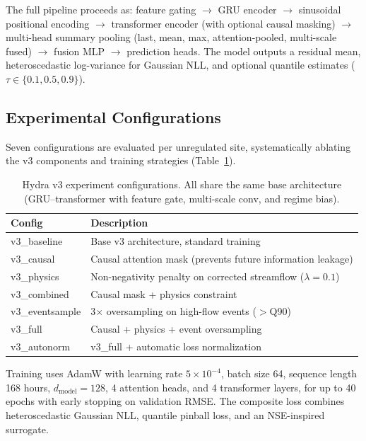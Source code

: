 \documentclass[draft]{agujournal2019}
\begin{document}
The full pipeline proceeds as: feature gating $\to$ GRU encoder $\to$ sinusoidal positional encoding $\to$ transformer encoder (with optional causal masking) $\to$ multi-head summary pooling (last, mean, max, attention-pooled, multi-scale fused) $\to$ fusion MLP $\to$ prediction heads. The model outputs a residual mean, heteroscedastic log-variance for Gaussian NLL, and optional quantile estimates ($\tau \in \{0.1, 0.5, 0.9\}$).

\subsection{Experimental Configurations}

Seven configurations are evaluated per unregulated site, systematically ablating the v3 components and training strategies (Table~\ref{tab:configs}).

\begin{table}
    \centering
    \caption{Hydra v3 experiment configurations. All share the same base architecture (GRU--transformer with feature gate, multi-scale conv, and regime bias).}
    \begin{tabular}{lp{8cm}}
        \toprule
        \textbf{Config} & \textbf{Description} \\
        \midrule
        v3\_baseline & Base v3 architecture, standard training \\
        v3\_causal & Causal attention mask (prevents future information leakage) \\
        v3\_physics & Non-negativity penalty on corrected streamflow ($\lambda = 0.1$) \\
        v3\_combined & Causal mask + physics constraint \\
        v3\_eventsample & 3$\times$ oversampling on high-flow events ($>$Q90) \\
        v3\_full & Causal + physics + event oversampling \\
        v3\_autonorm & v3\_full + automatic loss normalization \\
        \bottomrule
    \end{tabular}
    \label{tab:configs}
\end{table}

Training uses AdamW with learning rate $5 \times 10^{-4}$, batch size 64, sequence length 168 hours, $d_{\text{model}} = 128$, 4 attention heads, and 4 transformer layers, for up to 40 epochs with early stopping on validation RMSE. The composite loss combines heteroscedastic Gaussian NLL, quantile pinball loss, and an NSE-inspired surrogate.
\end{document}
